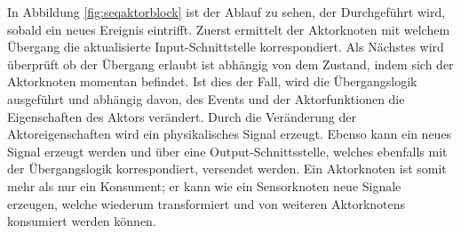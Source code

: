 In Abbildung \ref{fig:seqaktorblock} ist der Ablauf zu sehen, der Durchgeführt wird, sobald ein neues Ereignis eintrifft. Zuerst ermittelt der Aktorknoten mit welchem Übergang die aktualisierte Input-Schnittstelle korrespondiert. Als Nächstes wird überprüft ob der Übergang erlaubt ist abhängig von dem Zustand, indem sich der Aktorknoten momentan befindet. Ist dies der Fall, wird die Übergangslogik ausgeführt und abhängig davon, des Events und der Aktorfunktionen die Eigenschaften des Aktors verändert. Durch die Veränderung der Aktoreigenschaften wird ein physikalisches Signal erzeugt. Ebenso kann ein neues Signal erzeugt werden und über eine Output-Schnittsstelle, welches ebenfalls mit der Übergangslogik korrespondiert, versendet werden. Ein Aktorknoten ist somit mehr als nur ein Konsument; er kann wie ein Sensorknoten neue Signale erzeugen, welche wiederum transformiert und von weiteren Aktorknotens konsumiert werden können.

